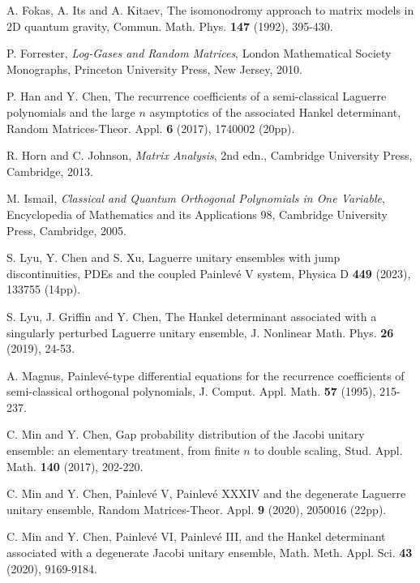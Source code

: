 \documentclass[12pt,a4paper]{article}    %
\numberwithin{equation}{section}
\begin{document}
\begin{thebibliography}{}
A. Fokas, A. Its and A. Kitaev, The isomonodromy approach to matrix models in 2D quantum gravity, Commun. Math. Phys. {\bf 147} (1992), 395-430.

P. Forrester, {\em Log-Gases and Random Matrices}, {London Mathematical Society Monographs},  {Princeton University Press}, {New Jersey}, {2010}.

  P. Han and Y. Chen, The recurrence coefficients of a semi-classical Laguerre polynomials
 and the large $n$ asymptotics of the associated Hankel determinant, Random Matrices-Theor. Appl. {\bf 6} (2017), 1740002 (20pp).

R. Horn and C. Johnson, {\em Matrix Analysis}, 2nd edn., Cambridge University Press, Cambridge, 2013.

		{M. Ismail}, {\em Classical and Quantum Orthogonal Polynomials in One Variable}, {Encyclopedia of Mathematics and its Applications 98}, {Cambridge University Press}, {Cambridge}, {2005}.
		
		{S. Lyu, Y. Chen and S. Xu}, Laguerre unitary ensembles with jump discontinuities, PDEs and the coupled Painlev\'e V system,  Physica D  {\bf 449} ({2023}), {133755 (14pp)}.
		

		{S. Lyu, J. Griffin and Y. Chen},   The Hankel determinant associated with a singularly perturbed Laguerre unitary ensemble,  J. Nonlinear Math. Phys. {\bf 26} ({2019}), {24-53}.

A. Magnus, Painlev\'{e}-type differential equations for the recurrence coefficients of semi-classical orthogonal polynomials, J. Comput. Appl. Math. {\bf 57} (1995), 215-237.
		

C. Min and Y. Chen, Gap probability distribution of the Jacobi unitary ensemble: an elementary treatment, from finite $n$ to double scaling, Stud. Appl. Math. {\bf 140} (2017), 202-220.

C. Min and Y. Chen, Painlev\'{e} V, Painlev\'{e} XXXIV and the degenerate Laguerre unitary ensemble, Random Matrices-Theor. Appl. {\bf 9} (2020), 2050016 (22pp).


C. Min and Y. Chen, Painlev\'{e} VI, Painlev\'{e} III, and the Hankel determinant associated with a degenerate Jacobi unitary ensemble, Math. Meth. Appl. Sci. {\bf 43} (2020), 9169-9184.


\end{thebibliography}
\end{document}

